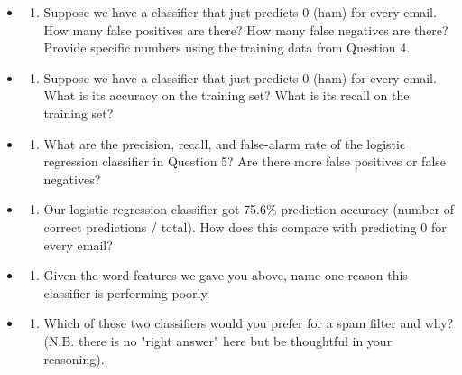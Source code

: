 \documentclass[11pt]{article}
\providecommand{\tightlist}{%
      \setlength{\itemsep}{0pt}\setlength{\parskip}{0pt}}
\begin{document}
\begin{itemize}
\item
  \begin{enumerate}
  \def\labelenumi{(\alph{enumi})}
  \tightlist
  \item
    Suppose we have a classifier that just predicts 0 (ham) for every
    email. How many false positives are there? How many false negatives
    are there? Provide specific numbers using the training data from
    Question 4.
  \end{enumerate}
\item
  \begin{enumerate}
  \def\labelenumi{(\alph{enumi})}
  \setcounter{enumi}{1}
  \tightlist
  \item
    Suppose we have a classifier that just predicts 0 (ham) for every
    email. What is its accuracy on the training set? What is its recall
    on the training set?
  \end{enumerate}
\item
  \begin{enumerate}
  \def\labelenumi{(\alph{enumi})}
  \setcounter{enumi}{2}
  \tightlist
  \item
    What are the precision, recall, and false-alarm rate of the logistic
    regression classifier in Question 5? Are there more false positives
    or false negatives?
  \end{enumerate}
\item
  \begin{enumerate}
  \def\labelenumi{(\alph{enumi})}
  \setcounter{enumi}{3}
  \tightlist
  \item
    Our logistic regression classifier got 75.6\% prediction accuracy
    (number of correct predictions / total). How does this compare with
    predicting 0 for every email?
  \end{enumerate}
\item
  \begin{enumerate}
  \def\labelenumi{(\alph{enumi})}
  \setcounter{enumi}{4}
  \tightlist
  \item
    Given the word features we gave you above, name one reason this
    classifier is performing poorly.
  \end{enumerate}
\item
  \begin{enumerate}
  \def\labelenumi{(\alph{enumi})}
  \setcounter{enumi}{5}
  \tightlist
  \item
    Which of these two classifiers would you prefer for a spam filter
    and why? (N.B. there is no "right answer" here but be thoughtful in
    your reasoning).
  \end{enumerate}
\end{itemize}
\end{document}
